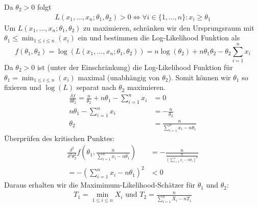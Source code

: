 Da $\theta_2 > 0$ folgt 
\begin{align*}
    L(x_1, ..., x_n; \theta_1, \theta_2) > 0 \iff \forall i \in \{1, \dots, n\}: x_i \geq \theta_1
\end{align*}
Um $L(x_1, ..., x_n; \theta_1, \theta_2)$ zu maximieren, schränken wir den Ursprungsraum mit $\theta_1 \leq \min_{1 \leq i \leq n}(x_i)$ ein 
und bestimmen die Log-Likelihood Funktion als
$$f(\theta_1, \theta_2) = \log\left(L(x_1, ..., x_n; \theta_1, \theta_2)\right) = n \log(\theta_2) + n \theta_1\theta_2 - \theta_2 \sum_{i = 1}^n x_i$$
Da $\theta_2 > 0$ ist (unter der Einschränkung) die Log-Likelihood Funktion für $\theta_1 = \min_{1 \leq i \leq n}(x_i)$ maximal (unabhängig von $\theta_2$).
Somit können wir $\theta_1$ so fixieren und $\log(L)$ separat nach $\theta_2$ maximieren. 
\begin{align*}
    \frac{\delta f}{\delta \theta_2} = \frac{n}{\theta_2} + n\theta_1 - \sum_{i = 1}^n x_i&= 0\\
    n\theta_1 - \sum_{i = 1}^n x_i&= -\frac{n}{\theta_2}\\
    \theta_2 &= \frac{n}{\sum_{i = 1}^n x_i - n \theta_1}
\end{align*}
Überprüfen des kritischen Punktes:
\begin{align*}
     \frac{\delta^2}{\delta^2\theta_2^2}f\left(\theta_1, \frac{n}{\sum_{i = 1}^n x_i - n\theta_1}\right) &= -\frac{n}{\frac{n}{\left(\sum_{i = 1}^n x_i - n\theta_1\right)^2}}\\
     = -\left(\sum_{i = 1}^n x_i - n \theta_1\right)^2 &< 0
\end{align*}
Daraus erhalten wir die Maximimum-Likelihood-Schätzer für $\theta_1$ und $\theta_2$:
\begin{align*}
    T_1 = \min_{1\leq i \leq n}X_i \text{ und } T_2 = \frac{n}{\sum_{i=1}^n X_i - nT_1}
\end{align*}

